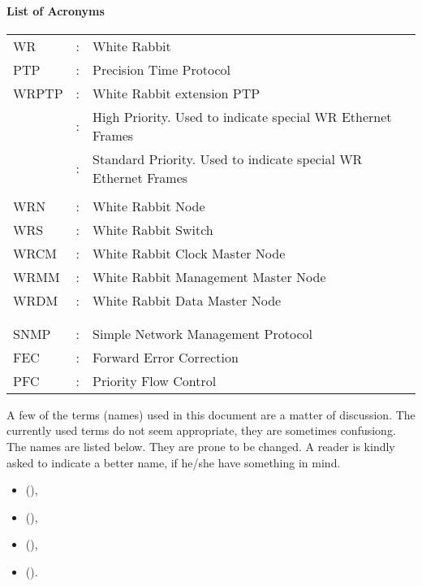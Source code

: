 \paragraph*{List of Acronyms}

\vspace{3 cm}

\normalsize
\begin{flushleft}
	\begin{tabular}{lcl} 
		WR & : & White Rabbit \\ 
		PTP & : & Precision Time Protocol \\
		WRPTP & : & White Rabbit extension PTP \\
		\HP & : & High Priority. Used to indicate special WR Ethernet
			Frames\\
		\SP & : & Standard Priority. Used to indicate special WR
			  Ethernet Frames\\
		&& \\
		WRN & : & White Rabbit Node \\
		WRS & : & White Rabbit Switch \\
		WRCM & : & White Rabbit Clock Master Node \\
		WRMM & : & White Rabbit Management Master Node \\
		WRDM & : & White Rabbit Data Master Node \\
		&&\\
		&&\\
		SNMP & : & Simple Network Management Protocol \\
		FEC & : & Forward Error Correction\\
		PFC & : & Priority Flow Control \\


	\end{tabular}
\end{flushleft}

A few of the terms (names) used in this document are a matter of discussion.
The currently used terms do not seem appropriate, they are sometimes
confusiong. The names are listed below. They are prone to be changed. A reader
is kindly asked to indicate a better name, if he/she have something in mind.

\begin{itemize}
  \item \HighPriority (\HP),
  \item \StandardPriority (\SP),
  \item \GranularityWindow (\GW),
  \item \ControlMessage (\CM).
\end{itemize}

\newpage

